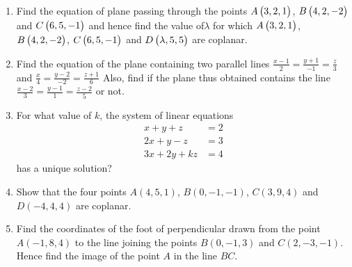 \begin{enumerate}
	\item Find the equation of plane passing through the points $A\begin{pmatrix}3 , 2 , 1\end{pmatrix}$,
$B\begin{pmatrix}4, 2, -2\end{pmatrix}$ and $C\begin{pmatrix}6, 5, -1\end{pmatrix}$ and hence find the value of$\lambda$ for which 
$A\begin{pmatrix}3, 2 , 1\end{pmatrix}$, $B\begin{pmatrix}4 , 2 , -2\end{pmatrix}$, $C\begin{pmatrix}6 , 5 , -1\end{pmatrix}$ and $D\begin{pmatrix}\lambda , 5 , 5\end{pmatrix}$
are coplanar.

	\item Find the equation of the plane containing two parallel lines
$\frac{x-1}{2} = \frac{y+1}{-1} = \frac{z}{3}$ and $\frac{x}{4} = \frac{y-2}{-2} = \frac{z+1}{6}$
Also, find if the plane thus obtained contains the line 
$\frac{x-2}{3} =\frac{y-1}{1} = \frac{z-2}{5}$ or not.



	\item For what value of $k$, the system of linear equations 
	\begin{align*}
		x+y+z &= 2\\
		2x+y-z &=3\\
		3x+2y+kz &=4
	\end{align*}
	has a unique solution? 
	
	\item Show that the four points $A(4,5,1)$, $ B(0,-1,-1)$, 
$C(3,9,4)$ and $D(-4,4,4)$ are coplanar.

	\item Find the coordinates of the foot of perpendicular drawn from the point
$A(-1, 8, 4)$ to the line joining the points $B(0, -1, 3)$ and $C(2,-3,-1)$. Hence
find the image of the point $A$ in the line $BC$.

\end{enumerate}
